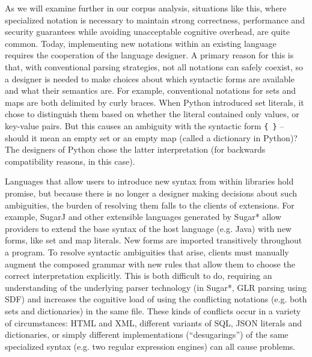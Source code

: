 As we will examine further in our corpus analysis, situations like this, where specialized notation is  necessary to maintain strong correctness, performance and security guarantees while avoiding unacceptable cognitive overhead, are quite common. 
Today, implementing new notations within an existing language requires the cooperation of the language designer. A primary reason for this is that, with conventional parsing strategies, not all notations can safely coexist, so a designer is needed to make choices about which syntactic forms are available and what their semantics are. For example, conventional notations for sets and maps are both delimited by curly braces. When Python introduced set literals, it chose to distinguish them based on whether the literal contained only values, or key-value pairs. But this causes an ambiguity with the syntactic form \verb|{ }| -- should it mean an empty set or an empty map (called a dictionary in Python)? The designers of Python chose the latter interpretation (for backwards compatibility reasons, in this case).

Languages that allow users to introduce new syntax from within libraries hold promise, but because there is no longer a designer making decisions about such ambiguities, the burden of resolving them falls to the clients of extensions. For example, SugarJ \cite{erdweg2011sugarj} and other extensible languages generated by Sugar* \cite{erdweg2013framework} allow providers to extend the base syntax of the host language (e.g. Java) with new forms, like set and map literals. New forms are imported transitively throughout a program. To resolve syntactic ambiguities that arise, clients must manually augment the composed grammar with new rules that allow them to choose the correct interpretation explicitly. This is both difficult to do, requiring an understanding of the underlying parser technology (in Sugar*, GLR parsing using SDF) and increases the cognitive load of using the conflicting notations (e.g. both sets and dictionaries) in the same file. These kinds of conflicts occur in a variety of circumstances: HTML and XML, different variants of SQL, JSON literals and dictionaries, or simply different implementations (``desugarings'') of the same specialized syntax (e.g. two regular expression engines) can all cause problems.


